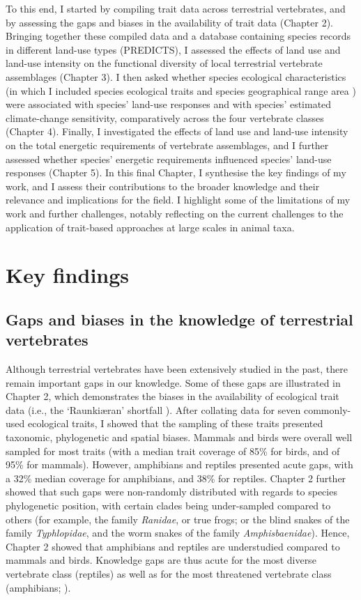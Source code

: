 To this end, I started by compiling trait data across terrestrial vertebrates, and by assessing the gaps and biases in the availability of trait data (Chapter 2). Bringing together these compiled data and a database containing species records in different land-use types (PREDICTS), I assessed the effects of land use and land-use intensity on the functional diversity of local terrestrial vertebrate assemblages (Chapter 3). I then asked whether species ecological characteristics (in which I included species ecological traits and species geographical range area ) were associated with species' land-use responses and with species' estimated climate-change sensitivity, comparatively across the four vertebrate classes (Chapter 4). Finally, I investigated the effects of land use and land-use intensity on the total energetic requirements of vertebrate assemblages, and I further assessed whether species' energetic requirements influenced species' land-use responses (Chapter 5). In this final Chapter, I synthesise the key findings of my work, and I assess their contributions to the broader knowledge and their relevance and implications for the field. I highlight some of the limitations of my work and further challenges, notably reflecting on the current challenges to the application of trait-based approaches at large scales in animal taxa. 

\section{Key findings}

\subsection{Gaps and biases in the knowledge of terrestrial vertebrates}

Although terrestrial vertebrates have been extensively studied in the past, there remain important gaps in our knowledge. Some of these gaps are illustrated in Chapter 2, which demonstrates the biases in the availability of ecological trait data (i.e., the ‘Raunki{\ae}ran’ shortfall \citep{Hortal2015}). After collating data for seven commonly-used ecological traits, I showed that the sampling of these traits  presented taxonomic, phylogenetic and spatial biases. Mammals and birds were overall well sampled for most traits (with a median trait coverage of 85\% for birds, and of 95\% for mammals). However, amphibians and reptiles presented acute gaps, with a 32\% median coverage for amphibians, and 38\% for reptiles. Chapter 2 further showed that such gaps were non-randomly distributed with regards to species phylogenetic position, with certain clades being under-sampled compared to others (for example, the family \textit{Ranidae}, or true frogs; or the blind snakes of the family \textit{Typhlopidae}, and the  worm snakes of the family \textit{Amphisbaenidae}). Hence, Chapter 2 showed that amphibians and reptiles are understudied compared to mammals and birds. Knowledge gaps are thus acute for the most diverse vertebrate class (reptiles) as well as for the most threatened vertebrate class (amphibians; \citet{IUCN2020}).
 
